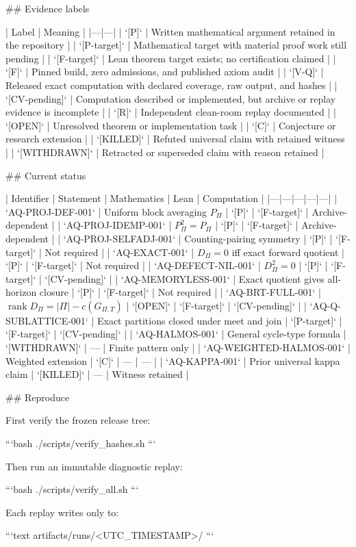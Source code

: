 ## Evidence labels

| Label | Meaning |
|---|---|
| `[P]` | Written mathematical argument retained in the repository |
| `[P-target]` | Mathematical target with material proof work still pending |
| `[F-target]` | Lean theorem target exists; no certification claimed |
| `[F]` | Pinned build, zero admissions, and published axiom audit |
| `[V-Q]` | Released exact computation with declared coverage, raw output, and hashes |
| `[CV-pending]` | Computation described or implemented, but archive or replay evidence is incomplete |
| `[R]` | Independent clean-room replay documented |
| `[OPEN]` | Unresolved theorem or implementation task |
| `[C]` | Conjecture or research extension |
| `[KILLED]` | Refuted universal claim with retained witness |
| `[WITHDRAWN]` | Retracted or superseded claim with reason retained |

## Current status

| Identifier | Statement | Mathematics | Lean | Computation |
|---|---|---|---|---|
| `AQ-PROJ-DEF-001` | Uniform block averaging \(P_\Pi\) | `[P]` | `[F-target]` | Archive-dependent |
| `AQ-PROJ-IDEMP-001` | \(P_\Pi^2=P_\Pi\) | `[P]` | `[F-target]` | Archive-dependent |
| `AQ-PROJ-SELFADJ-001` | Counting-pairing symmetry | `[P]` | `[F-target]` | Not required |
| `AQ-EXACT-001` | \(D_\Pi=0\) iff exact forward quotient | `[P]` | `[F-target]` | Not required |
| `AQ-DEFECT-NIL-001` | \(D_\Pi^2=0\) | `[P]` | `[F-target]` | `[CV-pending]` |
| `AQ-MEMORYLESS-001` | Exact quotient gives all-horizon closure | `[P]` | `[F-target]` | Not required |
| `AQ-BRT-FULL-001` | \(\operatorname{rank}D_\Pi=|\Pi|-c(G_{\Pi,T})\) | `[OPEN]` | `[F-target]` | `[CV-pending]` |
| `AQ-Q-SUBLATTICE-001` | Exact partitions closed under meet and join | `[P-target]` | `[F-target]` | `[CV-pending]` |
| `AQ-HALMOS-001` | General cycle-type formula | `[WITHDRAWN]` | — | Finite pattern only |
| `AQ-WEIGHTED-HALMOS-001` | Weighted extension | `[C]` | — | — |
| `AQ-KAPPA-001` | Prior universal kappa claim | `[KILLED]` | — | Witness retained |

## Reproduce

First verify the frozen release tree:

```bash
./scripts/verify_hashes.sh
```

Then run an immutable diagnostic replay:

```bash
./scripts/verify_all.sh
```

Each replay writes only to:

```text
artifacts/runs/<UTC_TIMESTAMP>/
```


